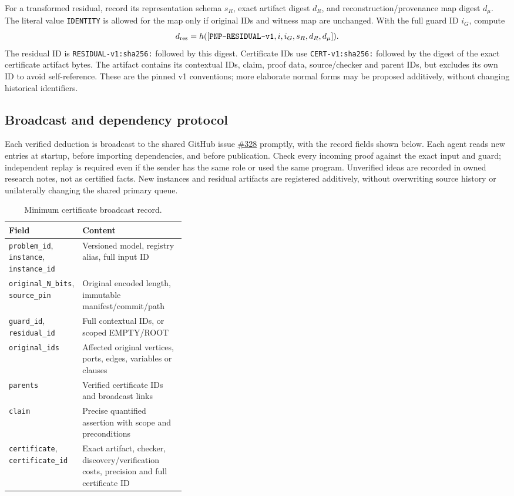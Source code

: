 \documentclass[11pt,letterpaper]{article}
\theoremstyle{definition}
\newcommand{\id}[1]{\nolinkurl{#1}}
\begin{document}
For a transformed residual, record its representation schema \(s_R\), exact artifact digest \(d_R\), and reconstruction/provenance map digest \(d_\mu\). The literal value \id{IDENTITY} is allowed for the map only if original IDs and witness map are unchanged. With the full guard ID \(i_G\), compute
\begin{equation}\label{eq:rid}
 d_{\mathrm{res}}=h([\text{\texttt{PNP-RESIDUAL-v1}},i,i_G,s_R,d_R,d_\mu]).
\end{equation}
The residual ID is \id{RESIDUAL-v1:sha256:} followed by this digest. Certificate IDs use \id{CERT-v1:sha256:} followed by the digest of the exact certificate artifact bytes. The artifact contains its contextual IDs, claim, proof data, source/checker and parent IDs, but excludes its own ID to avoid self-reference. These are the pinned v1 conventions; more elaborate normal forms may be proposed additively, without changing historical identifiers.

\subsection{Broadcast and dependency protocol}
Each verified deduction is broadcast to the shared GitHub issue \href{https://github.com/j15marti/pnp/issues/328}{\#328} promptly, with the record fields shown below. Each agent reads new entries at startup, before importing dependencies, and before publication. Check every incoming proof against the exact input and guard; independent replay is required even if the sender has the same role or used the same program. Unverified ideas are recorded in owned research notes, not as certified facts. New instances and residual artifacts are registered additively, without overwriting source history or unilaterally changing the shared primary queue.
\begin{table}[htbp]
\centering\small
\caption{Minimum certificate broadcast record.}\label{tab:message}
\begin{tabularx}{\linewidth}{@{}L{0.35\linewidth}Y@{}}
\toprule
Field & Content \\
\midrule
\id{problem_id}, \id{instance}, \id{instance_id} & Versioned model, registry alias, full input ID \\
\id{original_N_bits}, \id{source_pin} & Original encoded length, immutable manifest/commit/path \\
\id{guard_id}, \id{residual_id} & Full contextual IDs, or scoped EMPTY/ROOT \\
\id{original_ids} & Affected original vertices, ports, edges, variables or clauses \\
\id{parents} & Verified certificate IDs and broadcast links \\
\id{claim} & Precise quantified assertion with scope and preconditions \\
\id{certificate}, \id{certificate_id} & Exact artifact, checker, discovery/verification costs, precision and full certificate ID \\
\bottomrule
\end{tabularx}
\end{table}
\end{document}
